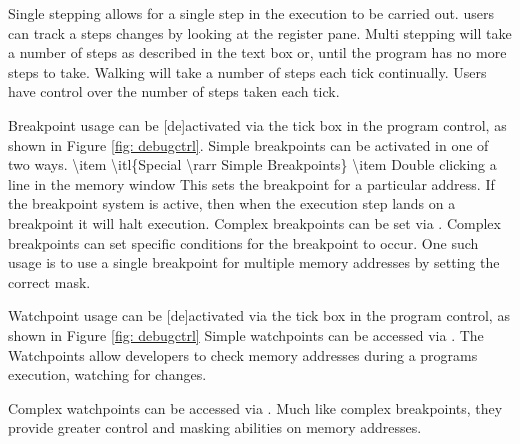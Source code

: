 \graphicspath{ {images/debug/} }
Single stepping allows for a single step in the execution to be carried out. users can track a steps changes by looking at the register pane.
Multi stepping will take a number of steps as described in the text box or, until the program has no more steps to take.
Walking will take a number of steps each tick continually. Users have control over the number of steps taken each tick.

Breakpoint usage can be [de]activated via the tick box in the program control, as shown in Figure \ref{fig: debugctrl}.
Simple breakpoints can be activated in one of two ways.
\num{
  \item \itl{Special \rarr Simple Breakpoints}
  \item Double clicking a line in the memory window
}
This sets the breakpoint for a particular address. If the breakpoint system is active, then when the execution step lands on a breakpoint it will halt execution.
Complex breakpoints can be set via . Complex breakpoints can set specific conditions for the breakpoint to occur. One such usage is to use a single breakpoint for multiple memory addresses by setting the correct mask.

Watchpoint usage can be [de]activated via the tick box in the program control, as shown in Figure \ref{fig: debugctrl}
Simple watchpoints can be accessed via . The Watchpoints allow developers to check memory addresses during a programs execution, watching for changes.

Complex watchpoints can be accessed via . Much like complex breakpoints, they provide greater control and masking abilities on memory addresses.
